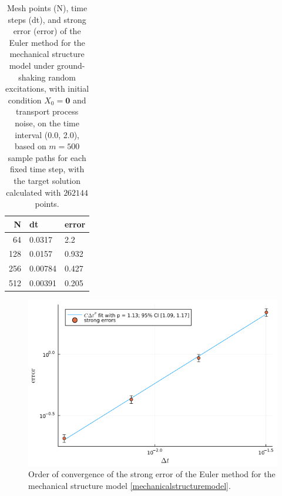 \documentclass[reqno,12pt]{amsart}
\theoremstyle{plain} %
\theoremstyle{definition} %
\begin{document}
\begin{table}
    \begin{tabular}[htb]{|r|l|l|}
        \hline N & dt & error\\
        \hline \hline
        64 & 0.0317 & 2.2 \\
        128 & 0.0157 & 0.932 \\
        256 & 0.00784 & 0.427 \\
        512 & 0.00391 & 0.205 \\
        \hline
    \end{tabular}
    \bigskip

    \caption{Mesh points (N), time steps (dt), and strong error (error) of the Euler method for the mechanical structure model under ground-shaking random excitations, with initial condition $X_0 = \mathbf{0}$ and transport process noise, on the time interval (0.0, 2.0), based on $m = 500$ sample paths for each fixed time step, with the target solution calculated with $262144$ points.}
    \label{tableearthquake}
\end{table}

\begin{figure}[htb]
    \includegraphics[scale=0.4]{img/convergence_earthquake.png}
    \caption{Order of convergence of the strong error of the Euler method for the mechanical structure model \eqref{mechanicalstructuremodel}.}
    \label{figearthquake}
\end{figure}
\end{document}
